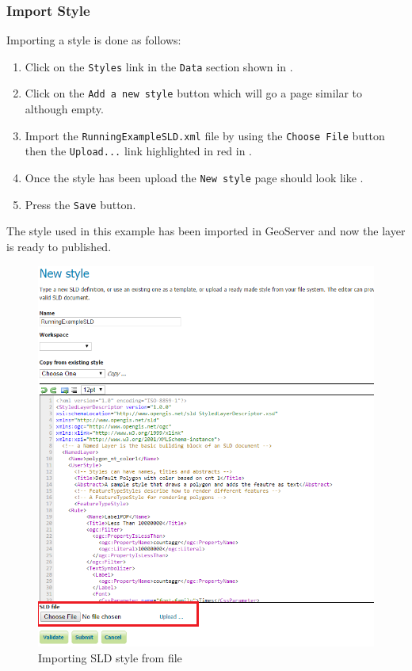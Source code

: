 \clearpage
\subsubsection{Import Style}
Importing a style is done as follows:
\begin{enumerate}[resume]
	\item Click on the \lstinline|Styles| link in the \lstinline|Data| section shown in .
	\item Click on the \lstinline|Add a new style| button which will go a page similar to  although empty.
	\item Import the \lstinline|RunningExampleSLD.xml| file by using the \lstinline|Choose File| button then the \lstinline|Upload...| link highlighted in red in .
	\item Once the style has been upload the \lstinline|New style| page should look like .
	\item Press the \lstinline|Save| button.
\end{enumerate}
The style used in this example has been imported in GeoServer and now the layer is ready to published.
\begin{figure}[h!]
	\centering
	\includegraphics[scale=0.5]{Figures/NewStyleImport.png}
	\caption{\label{fig:styleimport}Importing SLD style from file}
\end{figure}

